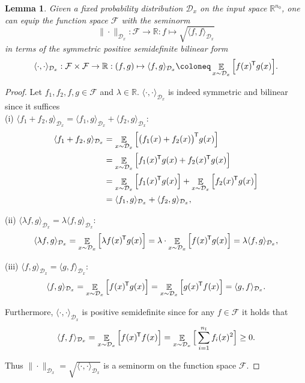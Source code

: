 \documentclass[11pt, a4paper]{article}
\newtheorem{lemma}[theorem]{Lemma}
\newcommand{\R}{\mathbb{R}}
\newcommand{\D}{\mathcal{D}}
\newcommand{\F}{\mathcal{F}}
\newcommand*{\tr}{^{\mkern-1.5mu\mathsf{T}}}
\DeclareMathOperator*{\E}{\mathbb{E}}
\begin{document}
\begin{lemma}
Given a fixed probability distribution $\D_x$ on the input space $\R^{n_0}$, one can equip the function space $\F$ with the seminorm
\[ \| \cdot \|_{\D_x} : \F \to \R : f \mapsto \sqrt{\langle f , f \rangle_{\D_x}} \] 
in terms of the symmetric positive semidefinite bilinear form
\[ \langle \cdot,\cdot \rangle_{\D_x} : \F \times \F \to \R : (f,g) \mapsto \langle f,g \rangle_{\D_x} \coloneq \E_{x \sim \D_x} \Big [ f(x)\tr g(x) \Big ].\]
\end{lemma}

\begin{proof}
Let $f_1, f_2, f, g \in \F$ and $\lambda \in \R$. $\langle \cdot,\cdot \rangle_{\D_x}$ is indeed symmetric and bilinear since it suffices \\

(i) $\langle f_1 + f_2 , g \rangle_{\D_x} = \langle f_1 , g \rangle_{\D_x} + \langle f_2 , g \rangle_{\D_x}$:
\[ \begin{split}
\langle f_1 + f_2 , g \rangle_{\D_x}
&= \E_{x \sim \D_x} \Big [ \big ( f_1(x) + f_2(x) \big )\tr g(x) \Big ] \\\
&= \E_{x \sim \D_x} \Big [ f_1(x)\tr g(x) + f_2(x)\tr g(x) \Big ] \\\
&= \E_{x \sim \D_x} \Big [ f_1(x)\tr g(x) \Big ] + \E_{x \sim \D_x} \Big [ f_2(x)\tr g(x) \Big ] \\\
&= \langle f_1 , g \rangle_{\D_x} + \langle f_2 , g \rangle_{\D_x},
\end{split} \]

(ii) $\langle \lambda f , g \rangle_{\D_x} = \lambda \langle f, g \rangle_{\D_x}$:
\[ \langle \lambda f , g \rangle_{\D_x} = \E_{x \sim \D_x} \Big [ \lambda f(x)\tr g(x) \Big ] = \lambda \cdot \E_{x \sim \D_x} \Big [ f(x)\tr g(x) \Big ] = \lambda \langle f, g \rangle_{\D_x}, \]

(iii) $\langle f , g \rangle_{\D_x} = \langle g , f \rangle_{\D_x}$:
\[ \langle f , g \rangle_{\D_x} = \E_{x \sim \D_x} \Big [ f(x)\tr g(x) \Big ] = \E_{x \sim \D_x} \Big [ g(x)\tr f(x) \Big ] = \langle g , f \rangle_{\D_x}. \]

Furthermore, $\langle \cdot,\cdot \rangle_{\D_x}$ is positive semidefinite since for any $f \in \F$ it holds that
\[ \langle f , f \rangle_{\D_x} =  \E_{x \sim \D_x} \Big [ f(x)\tr f(x) \Big ] = \E_{x \sim \D_x} \Big [ \sum_{i=1}^{n_l} f_i(x)^2 \Big ] \geq 0. \]

Thus $\| \cdot \|_{\D_x} = \sqrt{\langle \cdot , \cdot \rangle_{\D_x}}$ is a seminorm on the function space $\F$.
\end{proof}
\end{document}
